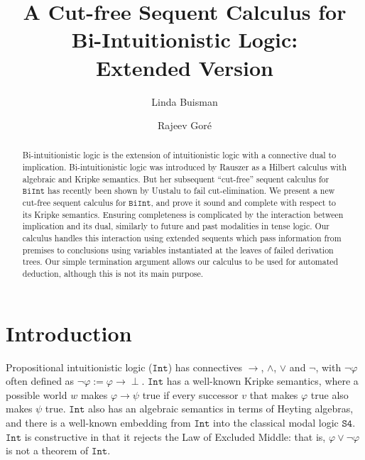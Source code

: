 \documentclass{llncs}
\numberwithin{equation}{section}
\newcommand{\Lg}[1]{\mathtt{#1}}
\newcommand{\ExAnd}{\wedge}
\newcommand{\ExOr}{\vee}
\newcommand{\ExNot}{\neg}
\newcommand{\ExImp}{\rightarrow}
\newcommand{\Bottom}{\perp}
\newcommand {\BiInt}{
        \Lg{BiInt}
}
\newcommand {\Int}{
        \Lg{Int}
}
\newcommand {\SFour}{
        \Lg{S4}
}
\begin{document}
\title{A Cut-free Sequent Calculus for\\  Bi-Intuitionistic Logic: \\ Extended Version}
\author{Linda Buisman \and Rajeev Gor\'{e}}
\maketitle

\begin{abstract}
  Bi-intuitionistic logic is the extension of intuitionistic logic
  with a connective dual to implication. Bi-intuitionistic logic was
  introduced by Rauszer as a Hilbert calculus with algebraic and
  Kripke semantics. But her subsequent ``cut-free'' sequent calculus
  for $\BiInt$ has recently been shown by Uustalu to fail
  cut-elimination.  We present a new cut-free sequent calculus for
  $\BiInt$, and prove it sound and complete with respect to its Kripke
  semantics. Ensuring completeness is complicated by the interaction between
  implication and its dual, similarly to future and past modalities in
  tense logic. Our calculus handles this interaction using extended sequents
  which pass information from premises to conclusions using variables
  instantiated at the leaves of failed derivation trees.
  Our simple termination argument allows our calculus to be used for
  automated deduction, although this is not its main purpose.
\end{abstract}

\section{Introduction}

Propositional intuitionistic logic ($\Int$) has connectives $\ExImp$, $\ExAnd$, $\ExOr$ and $\ExNot$, with $\ExNot \varphi$ often defined as $\ExNot \varphi := \varphi \ExImp \Bottom$. $\Int$ has a well-known Kripke semantics, where a possible world $w$ makes $\varphi \ExImp \psi$ true if every successor $v$ that makes $\varphi$ true also makes $\psi$ true. $\Int$ also has an algebraic semantics in terms of Heyting algebras, and there is a well-known embedding from $\Int$ into the classical modal logic $\SFour$. $\Int$ is constructive in that it rejects the Law of Excluded Middle: that is, $\varphi \ExOr \ExNot \varphi$ is not a theorem of $\Int$.
\end{document}
